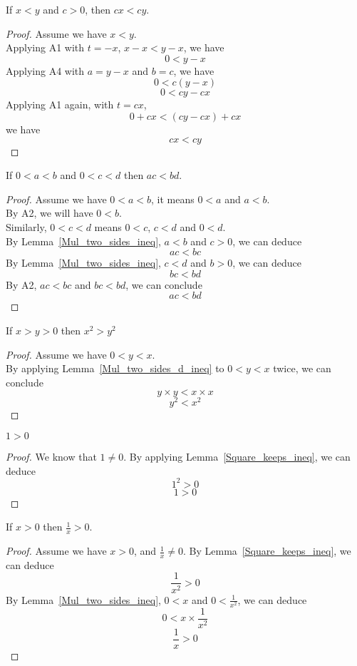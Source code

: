 \documentclass[a4paper]{article}
\begin{document}
\begin{nlemma}\label{Mul_two_sides_ineq}
If $x < y$ and $c > 0$, then $cx < cy$.
\end{nlemma}
\begin{proof}
Assume we have $x < y$.\\
Applying A1 with $t = -x$, $x - x < y - x$, we have $$ 0 < y - x$$
Applying A4 with $a = y - x$ and $b = c$, we have$$ 0 < c(y-x)$$
$$0 < cy - cx$$
Applying A1 again, with $t = cx$, $$0 + cx < (cy - cx) + cx$$we have $$cx < cy$$
\end{proof}

\begin{nlemma}\label{Mul_two_sides_d_ineq}
If $0 < a < b$ and $0 < c < d$ then $ac < bd$.
\end{nlemma}
\begin{proof}
Assume we have $0 < a < b$, it means $0 < a$ and $a < b$.\\
By A2, we will have $0 < b$.\\
Similarly, $0 < c < d$ means $0 < c$, $c < d$ and $0 < d$.\\
By Lemma~\ref{Mul_two_sides_ineq}, $a < b$ and $c > 0$, we can deduce$$ac < bc$$
By Lemma~\ref{Mul_two_sides_ineq}, $c < d$ and $b > 0$, we can deduce$$bc < bd$$
By A2, $ac < bc$ and $bc < bd$, we can conclude$$ac < bd$$
\end{proof}

\begin{ncor}\label{Square_keeps_ineq}
If $x > y > 0$ then $x^2 > y^2$
\end{ncor}
\begin{proof}
Assume we have $0 < y < x$.\\
By applying Lemma~\ref{Mul_two_sides_d_ineq} to $0 < y < x$ twice, we can conclude
$$y \times y < x \times x$$
$$y^2 < x^2$$
\end{proof}

\begin{ncor}\label{1>0}
$1 > 0$
\end{ncor}
\begin{proof}
We know that $1 \neq 0$. By applying Lemma~\ref{Square_keeps_ineq}, we can deduce
$$1^2 > 0$$
$$1 > 0$$
\end{proof}

\begin{nlemma}\label{inverse_g0}
If $x > 0$ then $\frac{1}{x} > 0$.
\end{nlemma}
\begin{proof}
Assume we have $x > 0$, and $\frac{1}{x} \neq 0$.
By Lemma~\ref{Square_keeps_ineq}, we can deduce$$\frac{1}{x^2} > 0$$
By Lemma~\ref{Mul_two_sides_ineq}, $0 < x$ and $0 < \frac{1}{x^2}$, we can deduce
$$0 < x \times \frac{1}{x^2}$$
$$\frac{1}{x} > 0$$
\end{proof}
\end{document}
